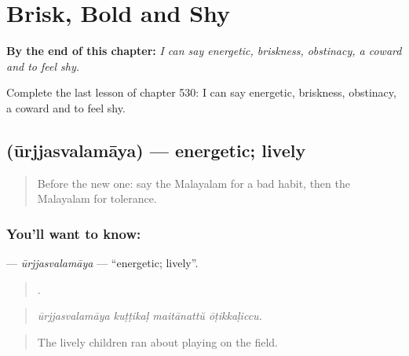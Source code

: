 
\chapter{Brisk, Bold and Shy}
\label{ch:ml-brisk-bold-and-shy}

\begin{chapteropening}
\textbf{By the end of this chapter:} \emph{I can say energetic, briskness, obstinacy, a coward and to feel shy.}

Complete the last lesson of chapter 530: I can say energetic, briskness, obstinacy, a coward and to feel shy.
\end{chapteropening}

\section[\texorpdfstring{\ml{ഊർജ്ജസ്വലമായ} (ūrjjasvalamāya)}{ഊർജ്ജസ്വലമായ (ūrjjasvalamāya)}]{ (ūrjjasvalamāya) — energetic; lively}

\label{lesson:ML-C530-urjjasvalamaya}



\begin{quote}
Before the new one: say the Malayalam for a bad habit, then the Malayalam for tolerance.
\end{quote}

\subsection*{You'll want to know: }
\textbf{} — \emph{ūrjjasvalamāya} — \textquotedblleft{}energetic; lively\textquotedblright{}.

\begin{quote}
   .
\end{quote}

\begin{quote}
\emph{ūrjjasvalamāya kuṭṭikaḷ maitānattŭ ōṭikkaḷiccu.}
\end{quote}

\begin{quote}
The lively children ran about playing on the field.
\end{quote}


